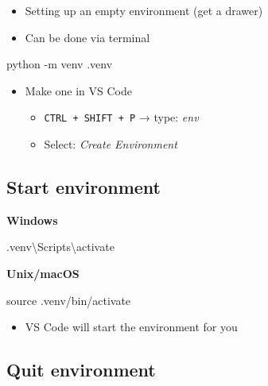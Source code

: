 \documentclass[
  letterpaper,
  DIV=11,
  numbers=noendperiod]{scrartcl}
\newenvironment{Shaded}{\begin{snugshade}}{\end{snugshade}}
\newcommand{\AttributeTok}[1]{\textcolor[rgb]{0.40,0.45,0.13}{#1}}
\newcommand{\BuiltInTok}[1]{\textcolor[rgb]{0.00,0.23,0.31}{#1}}
\newcommand{\ExtensionTok}[1]{\textcolor[rgb]{0.00,0.23,0.31}{#1}}
\newcommand{\NormalTok}[1]{\textcolor[rgb]{0.00,0.23,0.31}{#1}}
\providecommand{\tightlist}{%
  \setlength{\itemsep}{0pt}\setlength{\parskip}{0pt}}\usepackage{longtable,booktabs,array}
\begin{document}
\begin{itemize}
\tightlist
\item
  Setting up an empty environment (get a drawer)
\item
  Can be done via terminal
\end{itemize}

\begin{Shaded}
\begin{Highlighting}[]
\ExtensionTok{python} \AttributeTok{{-}m}\NormalTok{ venv .venv}
\end{Highlighting}
\end{Shaded}

\begin{itemize}
\tightlist
\item
  Make one in VS Code

  \begin{itemize}
  \tightlist
  \item
    \texttt{CTRL\ +\ SHIFT\ +\ P} → type: \emph{env}
  \item
    Select: \emph{Create Environment}
  \end{itemize}
\end{itemize}

\subsection{Start environment}\label{start-environment}

\textbf{Windows}

\begin{Shaded}
\begin{Highlighting}[]
\ExtensionTok{.venv\textbackslash{}Scripts\textbackslash{}activate}
\end{Highlighting}
\end{Shaded}

\textbf{Unix/macOS}

\begin{Shaded}
\begin{Highlighting}[]
\BuiltInTok{source}\NormalTok{ .venv/bin/activate}
\end{Highlighting}
\end{Shaded}

\begin{itemize}
\tightlist
\item
  VS Code will start the environment for you
\end{itemize}

\subsection{Quit environment}\label{quit-environment}
\end{document}
